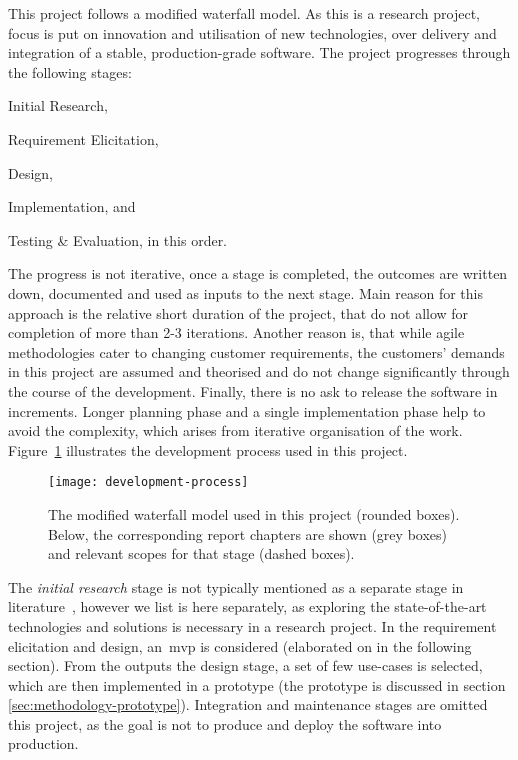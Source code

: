 This project follows a modified waterfall model. As this is a research project, focus is put on innovation and utilisation of new technologies, over delivery and integration of a stable, production-grade software. The project progresses through the following stages:
% 
\begin{enumerate*}[label=(\roman*)]
    \item Initial Research,
    \item Requirement Elicitation,
    \item Design,
    \item Implementation, and
    \item Testing \& Evaluation, in this order. 
\end{enumerate*}
% 
The progress is not iterative, once a stage is completed, the outcomes are written down, documented and used as inputs to the next stage. Main reason for this approach is the relative short duration of the project, that do not allow for completion of more than 2-3 iterations. Another reason is, that while agile methodologies cater to changing customer requirements, the customers' demands in this project are assumed and theorised and do not change significantly through the course of the development. Finally, there is no ask to release the software in increments. Longer planning phase and a single implementation phase help to avoid the complexity, which arises from iterative organisation of the work. Figure~\ref{fig:development-process} illustrates the development process used in this project.

\begin{figure}[htpb]
    \centering
    \texttt{[image: development-process]}
    \caption{The modified waterfall model used in this project (rounded boxes). Below, the corresponding report chapters are shown (grey boxes) and relevant scopes for that stage (dashed boxes).}
    \label{fig:development-process}
\end{figure}

The \textit{initial research} stage is not typically mentioned as a separate stage in literature~\cite{Sommerville2011SoftwareEngineering, CMS2005SELECTINGAPPROACH}, however we list is here separately, as exploring the state-of-the-art technologies and solutions is necessary in a research project. In the requirement elicitation and design, an~\acrfull{mvp} is considered (elaborated on in the following section). From the outputs the design stage, a set of few use-cases is selected, which are then implemented in a prototype
 (the prototype is discussed in section \ref{sec:methodology-prototype}). Integration and maintenance stages are omitted this project, as the goal is not to produce and deploy the software into production.